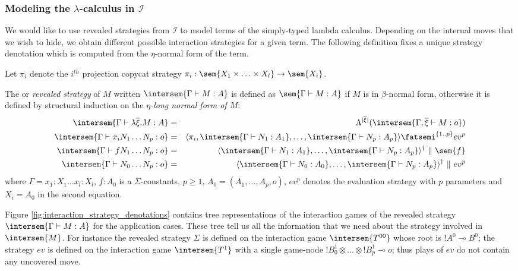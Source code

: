 \subsubsection{Modeling the $\lambda$-calculus in $\mathcal{I}$}

We would like to use revealed strategies from $\mathcal{I}$ to model terms of
the simply-typed lambda calculus.
Depending on the internal moves that we wish to hide, we obtain different possible interaction strategies for a given term.
The following definition fixes a unique strategy denotation which is computed from the $\eta$-normal form of the term.

\begin{definition}
\label{dfn:interactionstrategy_ofterms}
Let $\pi_i$ denote the $i^{th}$ projection copycat strategy $\pi_i : \sem{X_1 \times \ldots \times X_l} \rightarrow \sem{X_i}$.

The  or \emph{revealed strategy} of
$M$ written $\intersem{\Gamma \vdash M : A}$ is defined as
$\sem{\Gamma \vdash M : A}$ if $M$ is in $\beta$-normal form, otherwise
it is defined by structural induction on the \emph{$\eta$-long normal form of $M$}:
\begin{eqnarray*}
\intersem{\Gamma \vdash \lambda \overline{\xi} . M  : A} &=& \Lambda^{|\overline{\xi}|}(\intersem{\Gamma, \overline{\xi} \vdash M : o })  \\
\intersem{\Gamma  \vdash x_i N_1 \ldots N_p :o} &=& \langle \pi_i, \intersem{\Gamma \vdash N_1 : A_1}, \ldots, \intersem{\Gamma \vdash N_p : A_p}  \rangle \fatsemi ^{\{1..p\}} ev^p \\
\intersem{\Gamma \vdash f N_1 \ldots N_p : o} &=& \langle \intersem{\Gamma \vdash N_1 : A_1}, \ldots, \intersem{\Gamma \vdash N_p : A_p} \rangle^\dagger\  \|\ \sem{f} \\
\intersem{\Gamma \vdash N_0 \ldots N_p : o} &=& \langle \intersem{\Gamma \vdash N_0 : A_0}, \ldots, \intersem{\Gamma \vdash N_p : A_p}  \rangle^\dagger\ \|\ ev^p
\end{eqnarray*}
where $\Gamma = x_1 : X_1 \ldots x_l : X_l$, $f : A_0$ is a $\Sigma$-constants, $p\geq 1$, $A_0 =
(A_1,\ldots,A_p,o)$, $ev^p$ denotes the evaluation strategy with
$p$ parameters and $X_i = A_0$ in the second equation.
\end{definition}

Figure \ref{fig:interaction_strategy_denotations} contains tree representations of the interaction games of the revealed strategy $\intersem{\Gamma \vdash M : A}$ for the application cases. These tree tell us all the information that we need about the strategy involved in $\intersem{M}$. For instance the revealed strategy $\Sigma$ is defined on the interaction game $\intersem{T^{00}}$ whose root is $!A^0 \multimap B^0$; the strategy $ev$ is defined on the interaction game $\intersem{T^1}$ with a single game-node $!B_0^1 \otimes \ldots \otimes !B_p^1 \multimap o$; thus plays of $ev$ do not contain any uncovered move.


